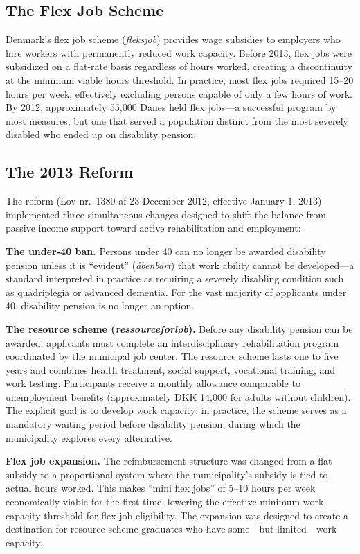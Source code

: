 \documentclass[12pt]{article}
\begin{document}
\subsection{The Flex Job Scheme}

Denmark's flex job scheme (\textit{fleksjob}) provides wage subsidies to employers who hire workers with permanently reduced work capacity. Before 2013, flex jobs were subsidized on a flat-rate basis regardless of hours worked, creating a discontinuity at the minimum viable hours threshold. In practice, most flex jobs required 15--20 hours per week, effectively excluding persons capable of only a few hours of work. By 2012, approximately 55,000 Danes held flex jobs---a successful program by most measures, but one that served a population distinct from the most severely disabled who ended up on disability pension.

\subsection{The 2013 Reform}

The reform (Lov nr.\ 1380 af 23 December 2012, effective January 1, 2013) implemented three simultaneous changes designed to shift the balance from passive income support toward active rehabilitation and employment:

\textbf{The under-40 ban.} Persons under 40 can no longer be awarded disability pension unless it is ``evident'' (\textit{\aa{}benbart}) that work ability cannot be developed---a standard interpreted in practice as requiring a severely disabling condition such as quadriplegia or advanced dementia. For the vast majority of applicants under 40, disability pension is no longer an option.

\textbf{The resource scheme (\textit{ressourceforl\o{}b}).} Before any disability pension can be awarded, applicants must complete an interdisciplinary rehabilitation program coordinated by the municipal job center. The resource scheme lasts one to five years and combines health treatment, social support, vocational training, and work testing. Participants receive a monthly allowance comparable to unemployment benefits (approximately DKK 14,000 for adults without children). The explicit goal is to develop work capacity; in practice, the scheme serves as a mandatory waiting period before disability pension, during which the municipality explores every alternative.

\textbf{Flex job expansion.} The reimbursement structure was changed from a flat subsidy to a proportional system where the municipality's subsidy is tied to actual hours worked. This makes ``mini flex jobs'' of 5--10 hours per week economically viable for the first time, lowering the effective minimum work capacity threshold for flex job eligibility. The expansion was designed to create a destination for resource scheme graduates who have some---but limited---work capacity.
\end{document}
